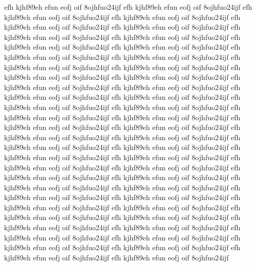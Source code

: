\documentclass[a4paper,12pt]{book} %
\begin{document}
efh kjhf89eh efun eofj oif 8ojhfuo24ijf
efh kjhf89eh efun eofj oif 8ojhfuo24ijf
efh kjhf89eh efun eofj oif 8ojhfuo24ijf
efh kjhf89eh efun eofj oif 8ojhfuo24ijf
efh kjhf89eh efun eofj oif 8ojhfuo24ijf
efh kjhf89eh efun eofj oif 8ojhfuo24ijf
efh kjhf89eh efun eofj oif 8ojhfuo24ijf
efh kjhf89eh efun eofj oif 8ojhfuo24ijf
efh kjhf89eh efun eofj oif 8ojhfuo24ijf
efh kjhf89eh efun eofj oif 8ojhfuo24ijf
efh kjhf89eh efun eofj oif 8ojhfuo24ijf
efh kjhf89eh efun eofj oif 8ojhfuo24ijf
efh kjhf89eh efun eofj oif 8ojhfuo24ijf
efh kjhf89eh efun eofj oif 8ojhfuo24ijf
efh kjhf89eh efun eofj oif 8ojhfuo24ijf
efh kjhf89eh efun eofj oif 8ojhfuo24ijf
efh kjhf89eh efun eofj oif 8ojhfuo24ijf
efh kjhf89eh efun eofj oif 8ojhfuo24ijf
efh kjhf89eh efun eofj oif 8ojhfuo24ijf
efh kjhf89eh efun eofj oif 8ojhfuo24ijf
efh kjhf89eh efun eofj oif 8ojhfuo24ijf
efh kjhf89eh efun eofj oif 8ojhfuo24ijf
efh kjhf89eh efun eofj oif 8ojhfuo24ijf
efh kjhf89eh efun eofj oif 8ojhfuo24ijf
efh kjhf89eh efun eofj oif 8ojhfuo24ijf
efh kjhf89eh efun eofj oif 8ojhfuo24ijf
efh kjhf89eh efun eofj oif 8ojhfuo24ijf
efh kjhf89eh efun eofj oif 8ojhfuo24ijf
efh kjhf89eh efun eofj oif 8ojhfuo24ijf
efh kjhf89eh efun eofj oif 8ojhfuo24ijf
efh kjhf89eh efun eofj oif 8ojhfuo24ijf
efh kjhf89eh efun eofj oif 8ojhfuo24ijf
efh kjhf89eh efun eofj oif 8ojhfuo24ijf
efh kjhf89eh efun eofj oif 8ojhfuo24ijf
efh kjhf89eh efun eofj oif 8ojhfuo24ijf
efh kjhf89eh efun eofj oif 8ojhfuo24ijf
efh kjhf89eh efun eofj oif 8ojhfuo24ijf
efh kjhf89eh efun eofj oif 8ojhfuo24ijf
efh kjhf89eh efun eofj oif 8ojhfuo24ijf
efh kjhf89eh efun eofj oif 8ojhfuo24ijf
efh kjhf89eh efun eofj oif 8ojhfuo24ijf
efh kjhf89eh efun eofj oif 8ojhfuo24ijf
efh kjhf89eh efun eofj oif 8ojhfuo24ijf
efh kjhf89eh efun eofj oif 8ojhfuo24ijf
efh kjhf89eh efun eofj oif 8ojhfuo24ijf
efh kjhf89eh efun eofj oif 8ojhfuo24ijf
efh kjhf89eh efun eofj oif 8ojhfuo24ijf
efh kjhf89eh efun eofj oif 8ojhfuo24ijf
efh kjhf89eh efun eofj oif 8ojhfuo24ijf
efh kjhf89eh efun eofj oif 8ojhfuo24ijf
efh kjhf89eh efun eofj oif 8ojhfuo24ijf
efh kjhf89eh efun eofj oif 8ojhfuo24ijf
\end{document}
